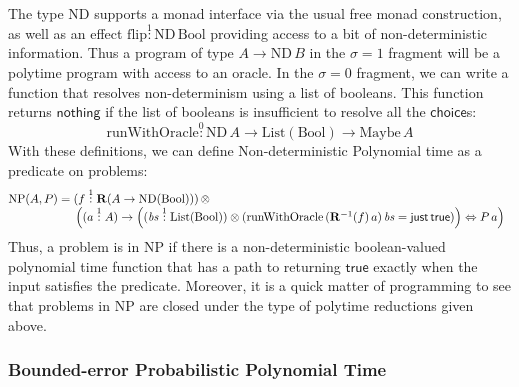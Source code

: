 \documentclass[acmsmall,screen]{acmart}
\newcommand{\BoolTy}{\mathrm{Bool}}
\newcommand{\cTrue}{\mathsf{true}}
\newcommand{\ListTy}{\mathrm{List}}
\begin{document}
The type $\mathrm{ND}$ supports a monad interface via the usual free
monad construction, as well as an effect
$\mathrm{flip} \stackrel1: \mathrm{ND}\,\BoolTy$ providing access to a
bit of non-deterministic information. Thus a program of type
$A \to \mathrm{ND}\,B$ in the $\sigma = 1$ fragment will be a polytime
program with access to an oracle. In the $\sigma = 0$ fragment, we can
write a function that resolves non-determinism using a list of
booleans. This function returns $\mathsf{nothing}$ if the list of
booleans is insufficient to resolve all the $\mathsf{choice}$s:
\begin{displaymath}
  \mathrm{runWithOracle} \stackrel0: \mathrm{ND}\,A \to \ListTy(\BoolTy) \to \mathrm{Maybe}\,A
\end{displaymath}
With these definitions, we can define Non-deterministic Polynomial
time as a predicate on problems:
\begin{displaymath}
  \mathrm{NP}(A,P) =
  \begin{array}[t]{@{}l}
    (f \stackrel1: \mathbf{R}(A \to \mathrm{ND}(\BoolTy)))\, \otimes \\
    \, \left((a \stackrel1: A) \to \left((\mathit{bs} \stackrel1: \ListTy(\BoolTy)) \otimes (\mathrm{runWithOracle}\,(\mathbf{R}^{-1}(f)\,a)\,\mathit{bs} = \mathsf{just}\,\cTrue)\right) \Leftrightarrow P\,a\right)
  \end{array}
\end{displaymath}
Thus, a problem is in NP if there is a non-deterministic
boolean-valued polynomial time function that has a path to returning
$\cTrue$ exactly when the input satisfies the predicate. Moreover, it is a
quick matter of programming to see that problems in NP are closed
under the type of polytime reductions given above.

\subsubsection{Bounded-error Probabilistic Polynomial Time}
\end{document}
